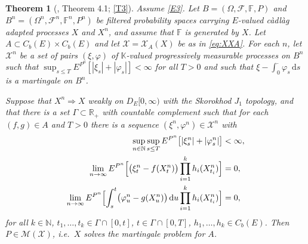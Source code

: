 \documentclass[11pt,a4paper]{article}
\theoremstyle{plain}
\newtheorem{theorem}{Theorem}[section]
\theoremstyle{definition}
\theoremstyle{remark}
\newcommand{\R}{\mathbb{R}}
\newcommand{\N}{\mathbb{N}}
\newcommand{\Rp}{\R_+}
\newcommand{\Cb}{C_b}                          %
\newcommand{\DE}{D_E[0,\infty)}
\newcommand{\Filt}{\mathcal{F}}
\newcommand{\K}{\mathbb{K}}
\newcommand{\XX}{\mathcal{X}}                  %
\newcommand{\Msol}{\mathcal{M}}
\newcommand{\dif}{\,\mathrm{d}}
\DeclareMathOperator*{\wto}{\Rightarrow}
\newcommand{\CPS}{\cite{CPS23}}
\begin{document}
\begin{theorem}[\CPS, Theorem 4.1; \eqref{T3}]
  \label{thm:CPSconv}
  Assume \eqref{E3}.  Let $B = (\Omega,\Filt,\mathbb{F},P)$ and
  $B^n = (\Omega^n,\Filt^n,\mathbb{F}^n,P^n)$ be filtered probability spaces
  carrying $E$-valued c\`adl\`ag adapted processes $X$ and $X^n$, and assume that
  $\mathbb{F}$ is generated by $X$.  Let $A \subset \Cb(E) \times \Cb(E)$ and let
  $\XX = \XX_A(X)$ be as in \eqref{eq:XXA}.  For each $n$, let $\XX^n$ be a set
  of pairs $(\xi,\varphi)$ of $\K$-valued progressively measurable processes on
  $B^n$ such that $\sup_{s \leq T} E^{P^n}[|\xi_s| + |\varphi_s|] < \infty$ for
  all $T>0$ and such that $\xi - \int_0^{\cdot} \varphi_s \dif s$ is a martingale
  on $B^n$.

  Suppose that $X^n \wto X$ weakly on $\DE$ with the Skorokhod $J_1$ topology,
  and that there is a set $\Gamma \subset \Rp$ with countable complement such
  that for each $(f,g) \in A$ and $T > 0$ there is a sequence
  $(\xi^n, \varphi^n) \in \XX^n$ with
  \begin{align}
    \label{eq:cps1}
    \sup_{n \in \N} \sup_{s \leq T} E^{P^n}\bigl[ |\xi^n_s| + |\varphi^n_s| \bigr]
      &< \infty , \\
    \label{eq:cps2}
    \lim_{n \to \infty}
      E^{P^n}\Bigl[ \bigl( \xi^n_t - f(X^n_t) \bigr)
        \prod_{i=1}^k h_i(X^n_{t_i}) \Bigr] &= 0 , \\
    \label{eq:cps3}
    \lim_{n \to \infty}
      E^{P^n}\Bigl[ \int_s^t \bigl( \varphi^n_u - g(X^n_u) \bigr) \dif u
        \prod_{i=1}^k h_i(X^n_{t_i}) \Bigr] &= 0 ,
  \end{align}
  for all $k \in \N$, $t_1,\dots,t_k \in \Gamma \cap [0,t]$,
  $t \in \Gamma \cap [0,T]$, $h_1,\dots,h_k \in \Cb(E)$.
  Then $P \in \Msol(\XX)$, i.e.\ $X$ solves the martingale problem for $A$.
\end{theorem}
\end{document}
